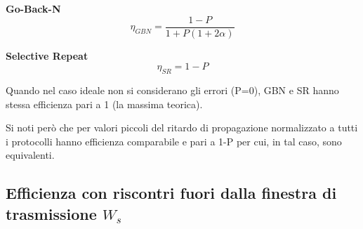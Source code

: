 \begin{center}
\begin{minipage}{0.45\textwidth}
    \textbf{Go-Back-N}
    \begin{equation*}
        \eta_{GBN} = \frac{1-P}{1 + P(1 + 2\alpha)}
    \end{equation*}
\end{minipage}
\hfill
\begin{minipage}{0.45\textwidth}
    \textbf{Selective Repeat}
    \begin{equation*}
        \eta_{SR} = 1 - P
    \end{equation*}
\end{minipage}
\end{center}

Quando nel caso ideale non si considerano gli errori (P=0),
GBN e SR hanno stessa efficienza pari a 1 (la massima
teorica).

Si noti però che per valori piccoli del ritardo di
propagazione normalizzato a tutti i protocolli hanno
efficienza comparabile e pari a 1-P per cui, in tal caso,
sono equivalenti.

\newpage

\subsection{Efficienza con riscontri fuori dalla finestra di trasmissione $W_s$}

